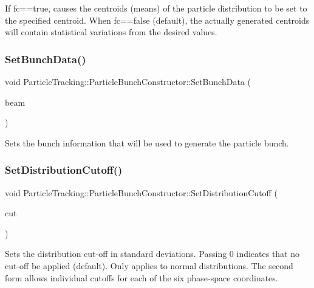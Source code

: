 If fc==true, causes the centroids (means) of the particle distribution to be set to the specified centroid. When fc==false (default), the actually generated centroids will contain statistical variations from the desired values. \mbox{\label{classParticleTracking_1_1ParticleBunchConstructor_a1ac0c6a860f9c965024ae98cdfad3061}} 
\subsubsection{\texorpdfstring{Set\+Bunch\+Data()}{SetBunchData()}}
{\footnotesize\ttfamily void Particle\+Tracking\+::\+Particle\+Bunch\+Constructor\+::\+Set\+Bunch\+Data (\begin{DoxyParamCaption}\item[{const \hyperlink{classBeamData}{Beam\+Data} \&}]{beam }\end{DoxyParamCaption})}

Sets the bunch information that will be used to generate the particle bunch. \mbox{\label{classParticleTracking_1_1ParticleBunchConstructor_ace6c25b2b60441f1741fb501f654c819}} 
\subsubsection{\texorpdfstring{Set\+Distribution\+Cutoff()}{SetDistributionCutoff()}}
{\footnotesize\ttfamily void Particle\+Tracking\+::\+Particle\+Bunch\+Constructor\+::\+Set\+Distribution\+Cutoff (\begin{DoxyParamCaption}\item[{double}]{cut }\end{DoxyParamCaption})}

Sets the distribution cut-\/off in standard deviations. Passing 0 indicates that no cut-\/off be applied (default). Only applies to normal distributions. The second form allows individual cutoffs for each of the six phase-\/space coordinates. \mbox{\label{classParticleTracking_1_1ParticleBunchConstructor_acbdb3fe8570599749338fc443899c581}} 
